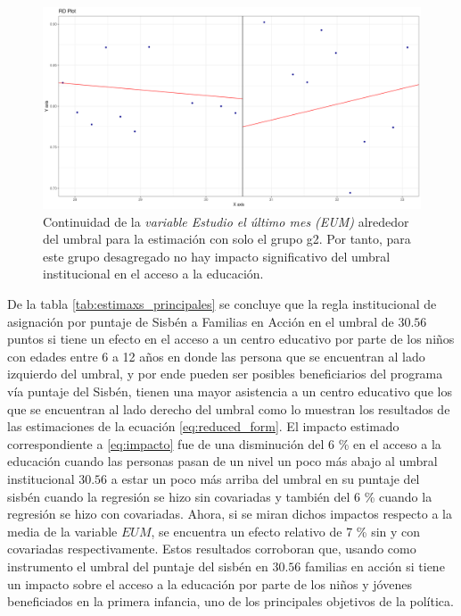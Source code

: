 \documentclass[AER]{AEA}
\begin{document}
\begin{figure}[h!]
    \centering
    \includegraphics[scale = 0.35]{imagenes/estimaxs_adicionales/g2_estimax.png}
    \caption{Continuidad de la \textit{variable Estudio el último mes (EUM)} alrededor del umbral para la estimación con solo el grupo g2. Por tanto, para este grupo desagregado no hay impacto significativo del umbral institucional en el acceso a la educación.}
    \label{fig:estimax_main_g2}
\end{figure}


De la tabla \ref{tab:estimaxs_principales} se concluye que la regla institucional de asignación por puntaje de Sisbén a Familias en Acción en el umbral de $30.56$ puntos si tiene un efecto en el acceso a un centro educativo por parte de los niños con edades entre 6 a 12 años en donde las persona que se encuentran al lado izquierdo del umbral, y por ende pueden ser posibles beneficiarios del programa vía puntaje del Sisbén, tienen una mayor asistencia a un centro educativo que los que se encuentran al lado derecho del umbral como lo muestran los resultados de las estimaciones de la ecuación \ref{eq:reduced_form}. El impacto estimado correspondiente a \ref{eq:impacto} fue de una disminución del 6 \% en el acceso a la educación cuando las personas pasan de un nivel un poco más abajo al umbral institucional $30.56$ a estar un poco más arriba del umbral en su puntaje del sisbén cuando la regresión se hizo sin covariadas y también del 6 \% cuando la regresión se hizo con covariadas. Ahora, si se miran dichos impactos respecto a la media de la variable $EUM$, se encuentra un efecto relativo de 7 \%   sin y con covariadas respectivamente. Estos resultados corroboran que, usando como instrumento el umbral del puntaje del sisbén en $30.56$ familias en acción si tiene un impacto sobre el acceso a la educación por parte de los niños y jóvenes beneficiados en la primera infancia, uno de los principales objetivos de la política. 
\end{document}
